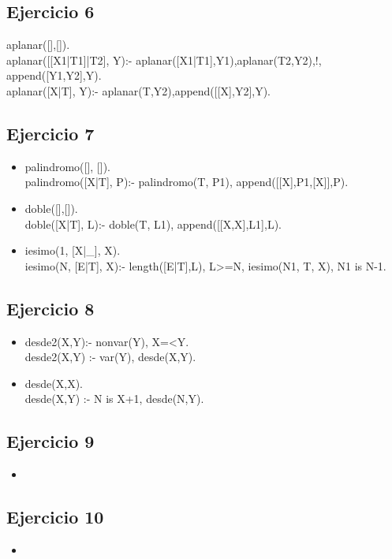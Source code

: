 \documentclass[10pt,a4paper]{article}
\begin{document}
\subsection{Ejercicio 6}
aplanar([],[]). \\
aplanar([[X1|T1]|T2], Y):- aplanar([X1|T1],Y1),aplanar(T2,Y2),!, append([Y1,Y2],Y). \\
aplanar([X|T], Y):- aplanar(T,Y2),append([[X],Y2],Y).

\subsection{Ejercicio 7}
\begin{itemize}
\item 
palindromo([], []). \\
palindromo([X|T], P):- palindromo(T, P1), append([[X],P1,[X]],P).
\item 
doble([],[]). \\
doble([X|T], L):- doble(T, L1), append([[X,X],L1],L).
\item 
iesimo(1, [X|_], X). \\
iesimo(N, [E|T], X):- length([E|T],L), L>=N, iesimo(N1, T, X), N1 is N-1.
\end{itemize}

\subsection{Ejercicio 8}
\begin{itemize}
\item desde2(X,Y):- nonvar(Y), X=<Y. \\
desde2(X,Y) :- var(Y), desde(X,Y).
\item desde(X,X). \\
desde(X,Y) :- N is X+1, desde(N,Y).
\end{itemize}

\subsection{Ejercicio 9}
\begin{itemize}
\item
\end{itemize}

\subsection{Ejercicio 10}
\begin{itemize}
\item
\end{itemize}
\end{document}
